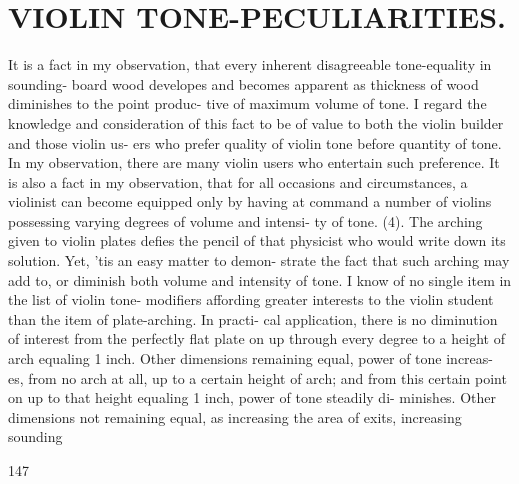 \documentclass{article}
\begin{document}
\section*{VIOLIN TONE-PECULIARITIES.}
It is a fact in my observation, that every inherent disagreeable tone-equality in sounding- board wood developes and becomes apparent as thickness of wood diminishes to the point produc- tive of maximum volume of tone. I regard the knowledge and consideration of this fact to be of value to both the violin builder and those violin us- ers who prefer quality of violin tone before quantity of tone. In my observation, there are many violin users who entertain such preference. It is also a fact in my observation, that for all occasions and circumstances, a violinist can become equipped only by having at command a number of violins possessing varying degrees of volume and intensi- ty of tone. (4). The arching given to violin plates defies the pencil of that physicist who would write down its solution. Yet, 'tis an easy matter to demon- strate the fact that such arching may add to, or diminish both volume and intensity of tone. I know of no single item in the list of violin tone- modifiers affording greater interests to the violin student than the item of plate-arching. In practi- cal application, there is no diminution of interest from the perfectly flat plate on up through every degree to a height of arch equaling 1 inch. Other dimensions remaining equal, power of tone increas- es, from no arch at all, up to a certain height of arch; and from this certain point on up to that height equaling 1 inch, power of tone steadily di- minishes. Other dimensions not remaining equal, as increasing the area of exits, increasing sounding

147
\end{document}
